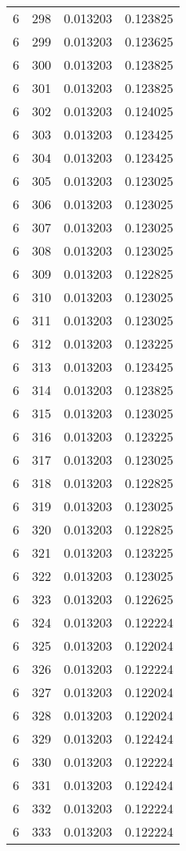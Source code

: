 \begin{longtable}{rrrr}
6 & 298 & 0.013203 & 0.123825 \\
6 & 299 & 0.013203 & 0.123625 \\
6 & 300 & 0.013203 & 0.123825 \\
6 & 301 & 0.013203 & 0.123825 \\
6 & 302 & 0.013203 & 0.124025 \\
6 & 303 & 0.013203 & 0.123425 \\
6 & 304 & 0.013203 & 0.123425 \\
6 & 305 & 0.013203 & 0.123025 \\
6 & 306 & 0.013203 & 0.123025 \\
6 & 307 & 0.013203 & 0.123025 \\
6 & 308 & 0.013203 & 0.123025 \\
6 & 309 & 0.013203 & 0.122825 \\
6 & 310 & 0.013203 & 0.123025 \\
6 & 311 & 0.013203 & 0.123025 \\
6 & 312 & 0.013203 & 0.123225 \\
6 & 313 & 0.013203 & 0.123425 \\
6 & 314 & 0.013203 & 0.123825 \\
6 & 315 & 0.013203 & 0.123025 \\
6 & 316 & 0.013203 & 0.123225 \\
6 & 317 & 0.013203 & 0.123025 \\
6 & 318 & 0.013203 & 0.122825 \\
6 & 319 & 0.013203 & 0.123025 \\
6 & 320 & 0.013203 & 0.122825 \\
6 & 321 & 0.013203 & 0.123225 \\
6 & 322 & 0.013203 & 0.123025 \\
6 & 323 & 0.013203 & 0.122625 \\
6 & 324 & 0.013203 & 0.122224 \\
6 & 325 & 0.013203 & 0.122024 \\
6 & 326 & 0.013203 & 0.122224 \\
6 & 327 & 0.013203 & 0.122024 \\
6 & 328 & 0.013203 & 0.122024 \\
6 & 329 & 0.013203 & 0.122424 \\
6 & 330 & 0.013203 & 0.122224 \\
6 & 331 & 0.013203 & 0.122424 \\
6 & 332 & 0.013203 & 0.122224 \\
6 & 333 & 0.013203 & 0.122224 \\

\end{longtable}
